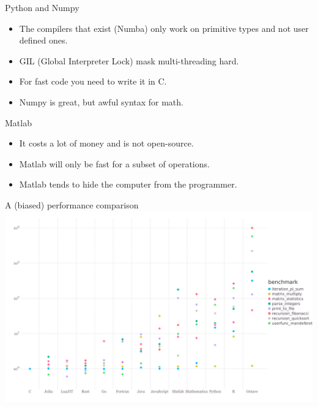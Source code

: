 \documentclass{beamer}
\begin{document}
\begin{frame}{Python and Numpy}
  \begin{itemize}
    \item The compilers that exist (Numba) only work on primitive types and not user defined ones.
    \item GIL (Global Interpreter Lock) mask multi-threading hard.
    \item For fast code you need to write it in C.
    \item Numpy is great, but awful syntax for math.
  \end{itemize}
\end{frame}

\begin{frame}{Matlab}
  \begin{itemize}
    \item It costs a lot of money and is not open-source.
    \item Matlab will only be fast for a subset of operations.
    \item Matlab tends to hide the computer from the programmer.
  \end{itemize}
\end{frame}

\begin{frame}{A (biased) performance comparison}
  \center
  \includegraphics[width=\linewidth]{benchmarks}
\end{frame}
\end{document}
